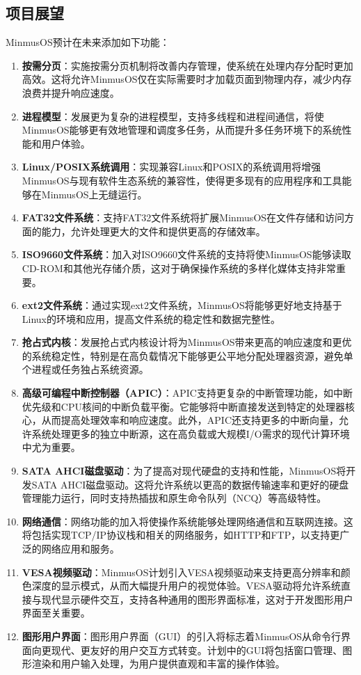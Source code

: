 \subsection{项目展望}

MinmusOS预计在未来添加如下功能：

\begin{enumerate}
    \item \textbf{按需分页}：实施按需分页机制将改善内存管理，使系统在处理内存分配时更加高效。这将允许MinmusOS仅在实际需要时才加载页面到物理内存，减少内存浪费并提升响应速度。
    \item \textbf{进程模型}：发展更为复杂的进程模型，支持多线程和进程间通信，将使MinmusOS能够更有效地管理和调度多任务，从而提升多任务环境下的系统性能和用户体验。
    \item \textbf{Linux/POSIX系统调用}：实现兼容Linux和POSIX的系统调用将增强MinmusOS与现有软件生态系统的兼容性，使得更多现有的应用程序和工具能够在MinmusOS上无缝运行。
    \item \textbf{FAT32文件系统}：支持FAT32文件系统将扩展MinmusOS在文件存储和访问方面的能力，允许处理更大的文件和提供更高的存储效率。
    \item \textbf{ISO9660文件系统}：加入对ISO9660文件系统的支持将使MinmusOS能够读取CD-ROM和其他光存储介质，这对于确保操作系统的多样化媒体支持非常重要。
    \item \textbf{ext2文件系统}：通过实现ext2文件系统，MinmusOS将能够更好地支持基于Linux的环境和应用，提高文件系统的稳定性和数据完整性。
    \item \textbf{抢占式内核}：发展抢占式内核设计将为MinmusOS带来更高的响应速度和更优的系统稳定性，特别是在高负载情况下能够更公平地分配处理器资源，避免单个进程或任务独占系统资源。
    \item \textbf{高级可编程中断控制器（APIC）}：APIC支持更复杂的中断管理功能，如中断优先级和CPU核间的中断负载平衡。它能够将中断直接发送到特定的处理器核心，从而提高处理效率和响应速度。此外，APIC还支持更多的中断向量，允许系统处理更多的独立中断源，这在高负载或大规模I/O需求的现代计算环境中尤为重要。
    \item \textbf{SATA AHCI磁盘驱动}：为了提高对现代硬盘的支持和性能，MinmusOS将开发SATA AHCI磁盘驱动。这将允许系统以更高的数据传输速率和更好的硬盘管理能力运行，同时支持热插拔和原生命令队列（NCQ）等高级特性。
    \item \textbf{网络通信}：网络功能的加入将使操作系统能够处理网络通信和互联网连接。这将包括实现TCP/IP协议栈和相关的网络服务，如HTTP和FTP，以支持更广泛的网络应用和服务。
    \item \textbf{VESA视频驱动}：MinmusOS计划引入VESA视频驱动来支持更高分辨率和颜色深度的显示模式，从而大幅提升用户的视觉体验。VESA驱动将允许系统直接与现代显示硬件交互，支持各种通用的图形界面标准，这对于开发图形用户界面至关重要。
    \item \textbf{图形用户界面}：图形用户界面（GUI）的引入将标志着MinmusOS从命令行界面向更现代、更友好的用户交互方式转变。计划中的GUI将包括窗口管理、图形渲染和用户输入处理，为用户提供直观和丰富的操作体验。
\end{enumerate}